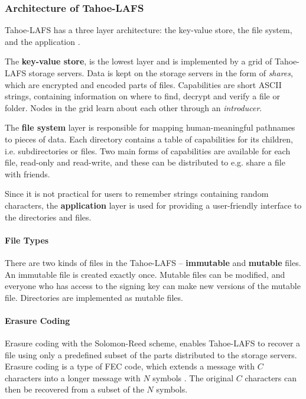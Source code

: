\documentclass[pdftex,english,10pt,b5paper,twoside]{book}
\begin{document}
\subsubsection{Architecture of Tahoe-LAFS}

Tahoe-\ac{LAFS} has a three layer architecture: the key-value store, the file system, and
the application \cite{tahoe}.

The \textbf{key-value store}, is the lowest layer and is implemented by a grid
of Tahoe-LAFS storage servers. Data is kept on the storage servers in the form
of \emph{shares}, which are encrypted and encoded parts of files. Capabilities
are short ASCII strings, containing information on where to find, decrypt and
verify a file or folder.  Nodes in the grid learn about each other through an
\emph{introducer}.

The \textbf{file system} layer is responsible for mapping human-meaningful
pathnames to pieces of data. Each directory contains a table of capabilities
for its children, i.e. subdirectories or files. Two main forms of capabilities
are available for each file, read-only and read-write, and these can be
distributed to e.g. share a file with friends.

Since it is not practical for users to remember strings containing random
characters, the \textbf{application} layer is used for providing a user-friendly
interface to the directories and files.

\paragraph{File Types} There are two kinds of files in the Tahoe-\ac{LAFS} --
\textbf{immutable} and \textbf{mutable} files. An immutable file is created
exactly once. Mutable files can be modified, and everyone who has access to the
signing key can make new versions of the mutable file. Directories are
implemented as mutable files.

\paragraph{Erasure Coding} Erasure coding with the Solomon-Reed scheme, enables
Tahoe-\ac{LAFS} to recover a file using only a predefined subset of the parts
distributed to the storage servers. Erasure coding is a type of \ac{FEC} code,
which extends a message with $C$ characters into a longer message with $N$
symbols \cite{t_reed-solomon}. The original $C$ characters can then be
recovered from a subset of the $N$ symbols.
\end{document}
